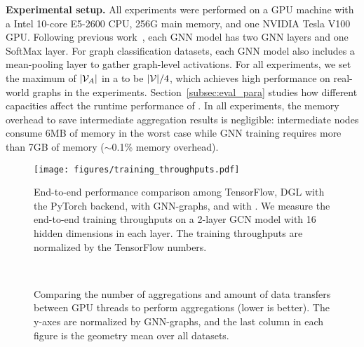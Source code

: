 
{\bf Experimental setup.} All experiments were performed on a GPU machine with a Intel 10-core E5-2600 CPU, 256G main memory, and one NVIDIA Tesla V100 GPU.
Following previous work~\cite{GCN, GraphSAGE}, each GNN model has two GNN layers and one SoftMax layer. For graph classification datasets, each GNN model also includes a mean-pooling layer to gather graph-level activations.
For all experiments, we set the maximum  of $|\mathcal{V}_A|$ in a \xg to be $|\mathcal{V}| / 4$, which achieves high performance on real-world graphs in the experiments.
Section~\ref{subsec:eval_para} studies how different capacities affect the runtime performance of \xgs.
In all experiments, the memory overhead to save intermediate aggregation results is negligible: intermediate nodes consume 6MB of memory in the worst case while GNN training requires more than 7GB of memory ($\sim$0.1\% memory overhead). 

\begin{figure}[t]
    \centering
    \texttt{[image: figures/training\_throughputs.pdf]}
    \caption{End-to-end performance comparison among TensorFlow, DGL with the PyTorch backend, \sys with GNN-graphs, and \sys with \xgs. 
    We measure the end-to-end training throughputs on a 2-layer GCN model with 16 hidden dimensions in each layer.
    The training throughputs are normalized by the TensorFlow numbers.}
    \label{fig:compare_training}
\end{figure}

\begin{figure}[t]
    \centering
    \\
    \vspace{-1mm}
    \caption{Comparing the number of aggregations and amount of data transfers between GPU threads to perform aggregations (lower is better). 
    The y-axes are normalized by GNN-graphs, and the last column in each figure is the geometry mean over all datasets.
    }
    \label{fig:comapre_aggregation}
\end{figure}

